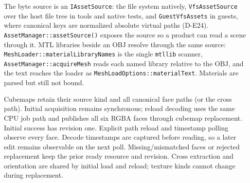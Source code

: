 The byte source is an \texttt{IAssetSource}: the file system natively,
\texttt{VfsAssetSource} over the host file tree in tools and native tests, and
\texttt{GuestVfsAssets} in guests, where canonical keys are normalized
absolute virtual paths (D-E24). \texttt{AssetManager::assetSource()} exposes
the source so a product can read a scene through it. MTL libraries beside an
OBJ resolve through the same source: \texttt{MeshLoader::materialLibraryNames}
is the single \texttt{mtllib} scanner, \texttt{AssetManager::acquireMesh}
reads each named library relative to the OBJ, and the text reaches the loader
as \texttt{MeshLoadOptions::materialText}. Materials are parsed but still not
bound.

Cubemaps retain their source kind and all canonical face paths (or the cross
path). Initial acquisition remains synchronous; reload decoding uses the same
CPU job path and publishes all six RGBA faces through cubemap replacement.
Initial success has revision one. Explicit path reload and timestamp polling
observe every face. Decode timestamps are captured before reading, so a later
edit remains observable on the next poll. Missing/mismatched faces or rejected
replacement keep the prior ready resource and revision. Cross extraction and
orientation are shared by initial load and reload; texture kinds cannot change
during replacement.

